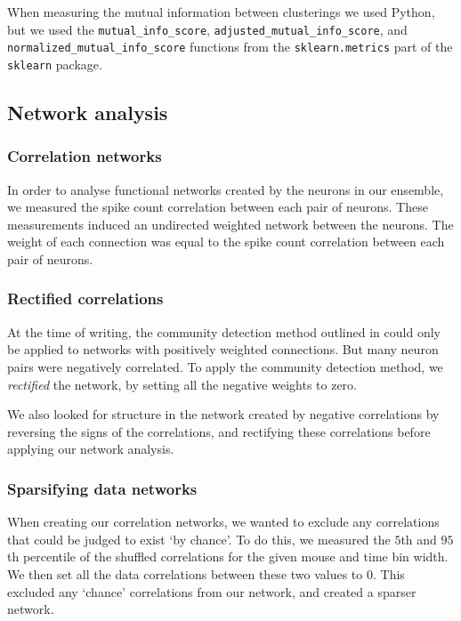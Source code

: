 \documentclass[a4paper,12pt]{article}
\theoremstyle{definition}
\begin{document}
        When measuring the mutual information between clusterings we used Python, but we used the \texttt{mutual\_info\_score}, \texttt{adjusted\_mutual\_info\_score}, and \texttt{normalized\_mutual\_info\_score} functions from the \texttt{sklearn.metrics} part of the \texttt{sklearn} package.

    \subsection{Network analysis}
        \subsubsection{Correlation networks}
        In order to analyse functional networks created by the neurons in our ensemble, we measured the spike count correlation between each pair of neurons. These measurements induced an undirected weighted network between the neurons. The weight of each connection was equal to the spike count correlation between each pair of neurons. 

        \subsubsection{Rectified correlations}
        At the time of writing, the community detection method outlined in \cite{humphries} could only be applied to networks with positively weighted connections. But many neuron pairs were negatively correlated. To apply the community detection method, we \textit{rectified} the network, by setting all the negative weights to zero.

        We also looked for structure in the network created by negative correlations by reversing the signs of the correlations, and rectifying these correlations before applying our network analysis.

        \subsubsection{Sparsifying data networks}\label{sec:sparsifying_data_networks}
        When creating our correlation networks, we wanted to exclude any correlations that could be judged to exist `by chance'. To do this, we measured the $5$th and $95$th percentile of the shuffled correlations for the given mouse and time bin width. We then set all the data correlations between these two values to $0$. This excluded any `chance' correlations from our network, and created a sparser network. 
\end{document}
